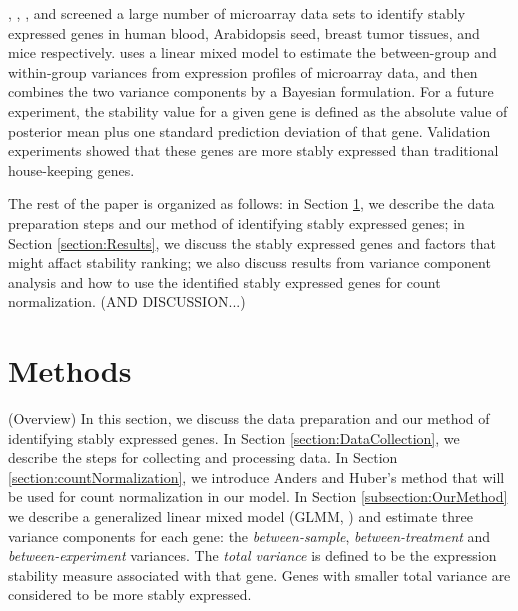 \documentclass[letterpaper,12pt]{article}
\begin{document}
\cite{stamova2009identification},  \citet{dekkers2012identification}, \citet{gur2009identification}, and
 \citet{frericks2008toolbox} screened a large number of microarray data sets
 to identify stably expressed genes in human blood, Arabidopsis seed, breast tumor tissues,
 and mice respectively.
\cite{andersen2004normalization} uses a linear mixed model to estimate the between-group and within-group variances from expression profiles of microarray data, and then combines the two variance components by a Bayesian formulation. For a future experiment, the stability value for a given gene is defined as the absolute value of posterior mean plus one standard prediction deviation of that gene.
Validation experiments \citep{czechowski2005genome, dekkers2012identification, huggett2005real,stamova2009identification} showed that these genes are more stably
expressed than traditional house-keeping genes.  

The rest of the paper is organized as follows: in Section \ref{section:Methods}, we describe the data preparation steps and our method of identifying stably expressed genes; in Section \ref{section:Results}, we discuss the stably expressed genes and factors that might affact stability ranking; we also discuss results from variance component analysis and how to use the identified stably expressed genes for count normalization. (AND DISCUSSION...)


\section{Methods} \label{section:Methods}
(Overview) In this section, we discuss the data preparation and our method of
identifying stably expressed genes. In Section \ref{section:DataCollection},
we describe the steps for collecting and processing data. In Section
\ref{section:countNormalization}, we introduce Anders and Huber's method that
will be used for count normalization in our model. In Section
\ref{subsection:OurMethod}  we describe a generalized linear mixed model (GLMM, \citealt{mcculloch2001generalized}) and estimate three variance components for each gene: the \textit{between-sample}, \textit{between-treatment} and \textit{between-experiment} variances.
 The \textit{total variance} is defined to be the expression stability measure associated with that gene. Genes with smaller total variance are considered to be more stably expressed. 
\end{document}
